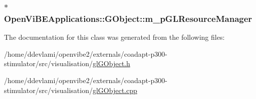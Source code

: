\label{classOpenViBEApplications_1_1GObject_a7ee79036a5ad68e821c6562545e24c39}
\hypertarget{classOpenViBEApplications_1_1GObject_adc285991bd494bd315215a8bdb15f0b9}{
\subsubsection[{m\_\-pGLResourceManager}]{$\ast$ {\bf OpenViBEApplications::GObject::m\_\-pGLResourceManager}}}
\label{classOpenViBEApplications_1_1GObject_adc285991bd494bd315215a8bdb15f0b9}


The documentation for this class was generated from the following files:\begin{DoxyCompactItemize}
\item 
/home/ddevlami/openvibe2/externals/coadapt-\/p300-\/stimulator/src/visualisation/\hyperlink{glGObject_8h}{glGObject.h}\item 
/home/ddevlami/openvibe2/externals/coadapt-\/p300-\/stimulator/src/visualisation/\hyperlink{glGObject_8cpp}{glGObject.cpp}\end{DoxyCompactItemize}
